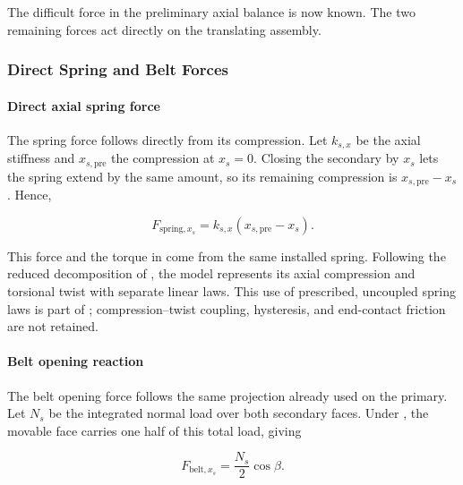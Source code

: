 \documentclass[11pt]{report}
\numberwithin{equation}{section}
\newcounter{assump}
\begin{document}
The difficult force in the preliminary axial balance is now known. The two
remaining forces act directly on the translating assembly.

\subsubsection{Direct Spring and Belt Forces}
\label{sec:secondary_direct_forces}

\paragraph{Direct axial spring force}
\label{sec:secondary_spring_closing_force}

The spring force follows directly from its compression. Let \(k_{s,x}\) be the
axial stiffness and \(x_{s,\mathrm{pre}}\) the compression at \(x_s=0\).
Closing the secondary by \(x_s\) lets the spring extend by the same amount, so
its remaining compression is \(x_{s,\mathrm{pre}}-x_s\). Hence,

\begin{equation}
    F_{\mathrm{spring},x_s}
    =
    k_{s,x}
    \left(x_{s,\mathrm{pre}}-x_s\right).
    \label{eq:secondary_axial_spring_force}
\end{equation}

This force and the torque in
 come from the same installed
spring. Following the reduced decomposition of \citet{KimEtAl2002}, the model
represents its axial compression and torsional twist with separate linear
laws. This use of prescribed, uncoupled spring laws is part of
; compression--twist coupling,
hysteresis, and end-contact friction are not retained.

\paragraph{Belt opening reaction}
\label{sec:secondary_belt_opening_reaction}

The belt opening force follows the same projection already used on the
primary. Let \(N_s\) be the integrated normal load over both secondary faces.
Under , the movable face carries one
half of this total load, giving

\begin{equation}
    F_{\mathrm{belt},x_s}
    =
    \frac{N_s}{2}\cos\beta.
    \label{eq:secondary_belt_axial_reaction}
\end{equation}
\end{document}
